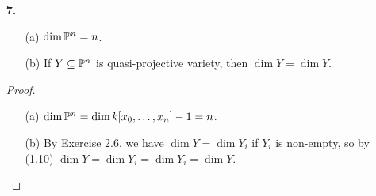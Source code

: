 \documentclass{article}
\begin{document}
\begin{enumerate} [label=\textbf{\arabic*.}, leftmargin=0cm]
\begin{proof}
    Let $\varphi_i : U_i \to \A^n$ be the homeomoprhism of (2.2),  let $Y_i$ be the affine variety $\varphi_i(Y \cap U_i)$, and let $A(Y_i)$ be its affine coordinate ring. If $g(y_1, \dots, y_n)$ is an element of $A(Y_i)$, then define the map $A(Y_i) \rightarrow S(Y)_{x_i}$ as $g(x_0 / x_i, \dots, x_n / x_i)$, or equivalently $g \mapsto \varphi_i^* g = g \circ \varphi_i$; thus we can identify $A(Y_i)$ with the subring of elements of degree $0$ of the localized ring $S(Y)_{x_i}$. Then, $S(Y)_{x_i} \simeq A(Y_i)[x_i, x_i^{-1}]$ since every monomial in $k[x_0, \dots, x_n]$ can be written as
    \begin{equation*}
        x_0^{d_0} \cdots x_i^{d_i} \cdots x_n^{d_n} = \frac{x_0^{d_0} \cdots \widehat{x_i^{d_i}} \cdots x_n^{d_n}}{x_i^{d_0 + \cdots + \widehat{d_i} + \cdots + d_n}} x_i^{d_0 + \cdots + d_n},
    \end{equation*}
    where $~\widehat{}~$ denotes omission, and the quotient is in the image of $A(Y_i) \to S(Y)_{x_i}$. By (1.8A), the dimension of $S(Y)$ is equal to the transcendence degree of the quotient field of $S(Y)$, which is isomorphic to the quotient field of $S(Y)_{x_i}$. The dimension of $A(Y_i)$ is equal to the dimension to $Y_i$ by (1.7). Therefore, we have
    \begin{align*}
        \dim{S(Y)} & = \dim{S(Y)_{x_i}} \\
        & = \dim{A(Y_i)[x_i, x_i^{-1}]} \\
        & = \dim{A(Y_i)} + 1 \\
        & = \dim{Y_i} + 1.
    \end{align*}
    Since the $Y_i$ cover $Y$, $\dim{Y} = \sup{\dim{Y_i}}$, so $\dim{S(Y)} = \dim{Y} + 1$ By (I, Ex. 1.10).
\end{proof}

\item[\textbf{7.}] \begin{itemize}
    \item[(a)] $\dim{\mathbb{P}^n} = n$.
    \item[(b)] If $Y \subseteq \mathbb{P}^n$ is quasi-projective variety, then $\dim{Y} = \dim{\overline{Y}}$.
\end{itemize}

\begin{proof} $ $ \vspace{0pt}
   \begin{itemize}
        \item[(a)] $\dim{\mathbb{P}^n} = \dim{k[x_0, \dots, x_n]} - 1 = n$.
        \item[(b)] By Exercise 2.6, we have $\dim{Y} = \dim{Y_i}$ if $Y_i$ is non-empty, so by (1.10) $\dim{\overline{Y}} = \dim{\overline{Y}_i} = \dim{Y_i} = \dim{Y}$.
   \end{itemize} 
\end{proof}


\end{enumerate}
\end{document}
